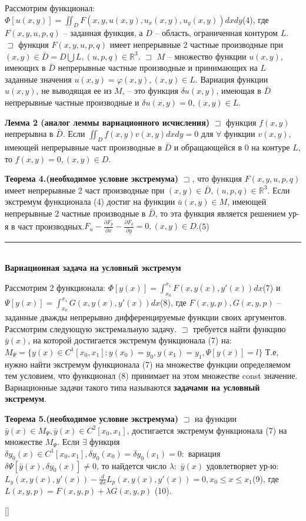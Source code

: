 Рассмотрим функционал:\\
$ \Phi[u(x, y)]=\iint_D F(x, y, u(x, y), u_x(x, y), u_y(x, y))dxdy$(4),
где $F(x, y, u, p, q)$ – заданная функция, а $D$ – область, ограниченная контуром $L$. $\sqsupset$ функция $F(x, y, u, p, q)$ имеет непрерывные 2 частные производные при $(x, y) \in \bar D = D \bigcup L, (u, p, q) \in \mathbb{R}^3$. $\sqsupset$ $M$ – множество функции $u(x, y)$, имеющих в $\bar D$ непрерывные частные производные и принимающих на $L$ заданные значения $u(x, y) = \varphi(x, y),(x, y) \in L$. Вариация функции $u(x, y)$, не выводящая ее из $M$, – это функция $\delta u(x, y)$, имеющая в $\bar D$ непрерывные частные производные и $\delta u(x, y) = 0,(x, y) \in L$.

\textbf{Лемма 2 (аналог леммы вариационного исчисления)}
    $\sqsupset$ функция $f(x, y)$ непрерывна в $\bar D$. Если
    $\iint_D f(x,y)v(x,y)dxdy=0$
    для $\forall$ функции $v(x, y)$, имеющей непрерывные част производные в $\bar D$ и обращающейся в 0 на контуре $L$, то $f(x, y) = 0, (x, y) \in D$.

\textbf{Теорема 4.(необходимое условие экстремума)}
    $\sqsupset$, что функция $F(x, y, u, p, q)$ имеет
    непрерывные 2 част производные при $(x, y) \in \bar D, (u, p, q) \in \mathbb{R}^3$.
    Если экстремум функционала (4) достиг на функции $\bar u(x, y) \in M$, имеющей непрерывные 2 частные производные в $\bar D$, то эта функция является решением ур-я в част производных.$F_u-\frac{\partial F_p}{\partial x}-\frac{\partial F_q}{\partial y}=0, (x,y)\in D.$(5)
    
\rule{275pt}{0.5pt} \\
\textbf{\large Вариационная задача на условный экстремум}

Рассмотрим 2 функционала: $\Phi[y(x)]=\int_{x_0}^{x_1} F(x,y(x),y'(x))dx$(7) и \\ $\Psi[y(x)]=\int_{x_0}^{x_1} G(x,y(x),y'(x))dx$(8),
где $F(x, y, p), G(x, y, p)$ – заданные дважды непрерывно дифференцируемые функции своих аргументов.
Рассмотрим следующую экстремальную задачу. $\sqsupset$ требуется найти функцию $\bar y(x)$, на которой достигается экстремум функционала (7) на:
$M_\Psi=\{y(x)\in C^1[x_0, x_1] : y(x_0) = y_0, y(x_1) = y_1, \Psi[y(x)]=l\}$
Т.е, нужно найти экстремум функционала (7) на
множестве функции определяемом тем условием, что функционал (8)
принимает на этом множестве const значение. Вариационные задачи такого типа называются \textbf{задачами на условный экстремум}.

\textbf{Теорема 5.(необходимое условие экстремума)}
    $\sqsupset$ на функции $\bar y(x) \in M_\Psi, \bar y(x) \in C^2[x_0, x_1]$,
    достигается экстремум функционала (7) на множестве $M_\Psi$. Если
    $\exists$ функция $\delta y_0(x) \in C^1[x_0, x_1], \delta y_0(x_0) = \delta y_0(x_1) = 0:$ вариация $\delta\Psi[\bar y(x), \delta y_0(x)] \neq 0$, то найдется число $\lambda:$ $\bar y(x)$ удовлетворяет ур-ю: $L_y(x, y(x), y'(x))-\frac{d}{dx}L_p(x, y(x), y'(x))=0, x_0 \leq x \leq x_1$(9), где $L(x, y, p) = F(x, y, p) + \lambda G(x, y, p)$ (10).
    
[\cite{denisov2}]